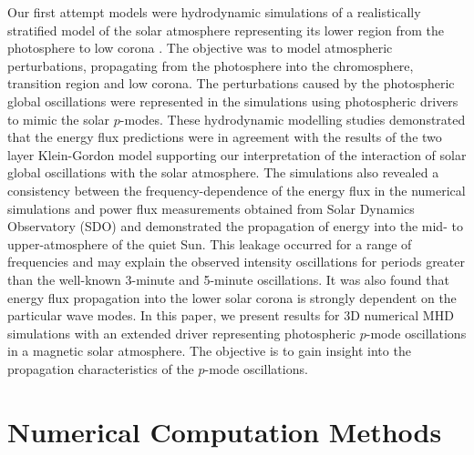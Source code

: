 \documentclass{aastex62}
\begin{document}
Our first attempt models were hydrodynamic simulations of a realistically stratified model of the solar atmosphere representing its lower region from the photosphere to low corona \citet{Griffiths2018}. The objective was to model atmospheric perturbations, propagating from the photosphere into the chromosphere, transition region and low corona. The perturbations caused by the photospheric global oscillations were represented in the simulations using photospheric drivers to mimic the solar $p$-modes. These hydrodynamic modelling studies demonstrated that the energy flux predictions were in agreement with the results of the two layer Klein-Gordon model supporting our interpretation of the interaction of solar global oscillations with the solar atmosphere. The simulations also revealed a consistency between the frequency-dependence of the energy flux in the numerical simulations and power flux measurements obtained from Solar Dynamics Observatory (SDO) and demonstrated the propagation of energy into the mid- to upper-atmosphere of the quiet Sun. This leakage occurred for a range of frequencies and may explain the observed intensity oscillations for periods greater than the well-known 3-minute and 5-minute oscillations. It was also found that energy flux propagation into the lower solar corona is strongly dependent on the particular wave modes.  In this paper, we present results for 3D numerical MHD simulations with an extended driver representing photospheric $p$-mode oscillations in a magnetic solar atmosphere. The objective is to gain insight into the propagation characteristics of the $p$-mode oscillations. 


\section{Numerical Computation Methods}
\end{document}
